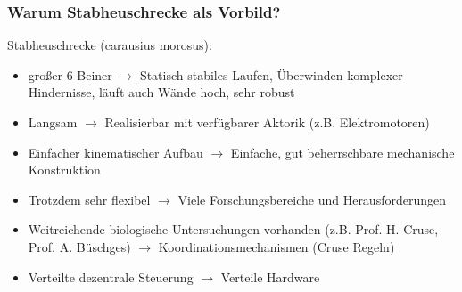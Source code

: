 \subsubsection{Warum Stabheuschrecke als Vorbild?}
Stabheuschrecke (carausius morosus):
\begin{itemize}
\item großer 6-Beiner $\rightarrow$ Statisch stabiles Laufen, Überwinden komplexer Hindernisse, läuft auch Wände hoch, sehr robust
\item Langsam $\rightarrow$ Realisierbar mit verfügbarer Aktorik (z.B. Elektromotoren)
\item Einfacher kinematischer Aufbau $\rightarrow$ Einfache, gut beherrschbare mechanische Konstruktion
\item Trotzdem sehr flexibel $\rightarrow$ Viele Forschungsbereiche und Herausforderungen
\item Weitreichende biologische Untersuchungen vorhanden (z.B. Prof. H. Cruse, Prof. A. Büschges) $\rightarrow$ Koordinationsmechanismen (\glqq Cruse Regeln\grqq)
\item Verteilte dezentrale Steuerung $\rightarrow$ Verteile Hardware
\end{itemize}
